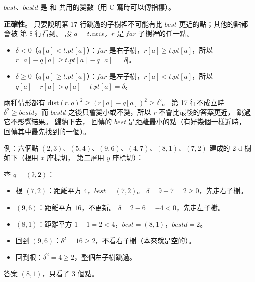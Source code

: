 \begin{pastsoln}
$\mathit{best}$、$\mathit{bestd}$ 是  和  共用的變數（用 C 寫時可以傳指標）。

\textbf{正確性}。 只要說明第 17 行跳過的子樹裡不可能有比 $\mathit{best}$ 更近的點；其他的點都會被
第 8 行看到。 設 $a = t.\mathit{axis}$，$r$ 是 $\mathit{far}$ 子樹裡的任一點。
\begin{itemize}
\item $\delta < 0$（$q[a] < t.\mathit{pt}[a]$）：$\mathit{far}$ 是右子樹，$r[a] \ge t.\mathit{pt}[a]$，所以
$r[a] - q[a] \ge t.\mathit{pt}[a] - q[a] = |\delta|$。
\item $\delta \ge 0$（$q[a] \ge t.\mathit{pt}[a]$）：$\mathit{far}$ 是左子樹，$r[a] < t.\mathit{pt}[a]$，所以
$q[a] - r[a] > q[a] - t.\mathit{pt}[a] = \delta$。
\end{itemize}
兩種情形都有 $\mathrm{dist}(r, q)^2 \ge (r[a] - q[a])^2 \ge \delta^2$。 第 17 行不成立時
$\delta^2 \ge \mathit{bestd}$，而 $\mathit{bestd}$ 之後只會變小或不變，所以 $r$ 不會比最後的答案更近，
跳過它不影響結果。 歸納下去， 回傳的 $\mathit{best}$ 是距離最小的點（有好幾個一樣近時，
回傳其中最先找到的一個）。

例：六個點 $(2,3)$、$(5,4)$、$(9,6)$、$(4,7)$、$(8,1)$、$(7,2)$ 建成的 2-d 樹如下（根用 $x$ 座標切，
第二層用 $y$ 座標切）：
\begin{center}
\end{center}
查 $q = (9,2)$：
\begin{itemize}
\item 根 $(7,2)$：距離平方 $4$，$\mathit{best} = (7,2)$。 $\delta = 9 - 7 = 2 \ge 0$，先走右子樹。
\item $(9,6)$：距離平方 $16$，不更新。 $\delta = 2 - 6 = -4 < 0$，先走左子樹。
\item $(8,1)$：距離平方 $1 + 1 = 2 < 4$，$\mathit{best} = (8,1)$，$\mathit{bestd} = 2$。
\item 回到 $(9,6)$：$\delta^2 = 16 \ge 2$，不看右子樹（本來就是空的）。
\item 回到根：$\delta^2 = 4 \ge 2$，整個左子樹跳過。
\end{itemize}
答案 $(8,1)$，只看了 $3$ 個點。


\end{pastsoln}
